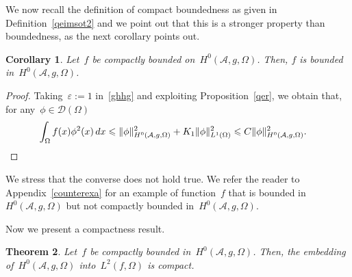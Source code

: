 \documentclass[11pt,hyp,]{nyjm}
\numberwithin{equation}{section}
\newtheorem{theorem}{Theorem}[section]
\newtheorem{corollary}[theorem]{Corollary}
\theoremstyle{remark}
\newcommand{\am}{\mathcal{A}}
\renewcommand{\leq}{\leqslant}
\renewcommand{\epsilon}{\varepsilon}
\begin{document}
We now recall the definition of compact boundedness as given in Definition~\eqref{qeimsot2} and we point out that this is a stronger property than boundedness, as the next corollary points out.
				
				\begin{corollary}\label{crol}
					Let~$f$ be compactly bounded on~$H^0(\am, g, \Omega )$. Then, $f$ is bounded in~$H^0(\am, g, \Omega )$.
				\end{corollary}
				
				\begin{proof}
Taking~$\epsilon:=1$ in~\eqref{ghhg}
	and exploiting Proposition~\ref{qer}, we obtain that, for any~$\phi \in \mathcal{D}(\Omega)$
\begin{equation*}
\int_{\Omega} f(x) \phi^2(x) \, dx \leq \| \phi\|^2_{H^0(\am, g, \Omega )} + K_{1} \Vert \phi \Vert_{L^1(\Omega)}^2 \leq C \| \phi\|^2_{H^0(\am, g, \Omega )}. \quad\qedhere
\end{equation*}
\end{proof}

We stress that the converse does not hold true.
We refer the reader to Appendix~\ref{counterexa} for an example of function~$f$ that is bounded in~$H^0(\mathcal{A}, g, \Omega )$ but not compactly bounded in~$H^0(\mathcal{A}, g,\Omega )$.

Now we present a compactness result.

\begin{theorem}\label{trente}
Let~$f$ be compactly bounded in~$H^0(\am, g, \Omega )$. Then, the embedding of~$H^0(\am, g, \Omega )$ into~$L^2(f, \Omega)$ is compact.
				\end{theorem}
	
\end{document}
